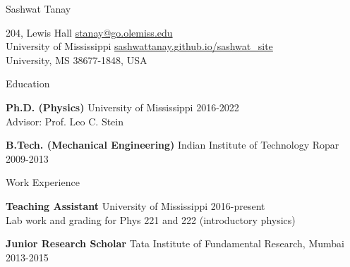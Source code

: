 \documentclass{resume} %
\begin{document}
  


  
  
\begin{center}
    {\huge Sashwat Tanay} \\ 
\end{center}



204, Lewis Hall   \hfill  \href{stanay@go.olemiss.edu}{stanay@go.olemiss.edu} \\
University of Mississippi   \hfill  \href{https://sashwattanay.github.io/sashwat_site}{sashwattanay.github.io/sashwat\_site}\\
University, MS 38677-1848, USA



\begin{rSection}{Education}


{\bf Ph.D. (Physics) } University of Mississippi \hfill {2016-2022}  \\
\hspace*{1cm} Advisor: Prof. Leo C. Stein 

{\bf B.Tech. (Mechanical Engineering) } Indian Institute of Technology Ropar \hfill {2009-2013}  

\end{rSection}



  

\begin{rSection}{Work Experience}

{\bf Teaching Assistant } University of Mississippi \hfill 2016-present  \\
\hspace*{1cm} Lab work and grading for Phys 221 and 222 (introductory physics) 


{\bf Junior Research Scholar} Tata Institute of Fundamental Research, Mumbai \hfill 2013-2015 


\end{rSection}
  
\end{document}
